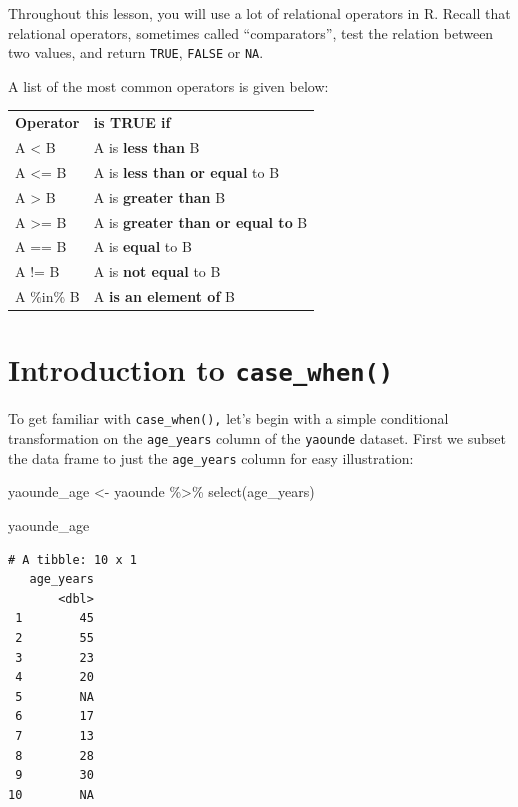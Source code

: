 \documentclass[
  letterpaper,
  DIV=11,
  numbers=noendperiod]{scrreprt}
\newenvironment{Shaded}{\begin{snugshade}}{\end{snugshade}}
\newcommand{\FunctionTok}[1]{\textcolor[rgb]{0.28,0.35,0.67}{#1}}
\newcommand{\NormalTok}[1]{\textcolor[rgb]{0.00,0.23,0.31}{#1}}
\newcommand{\OtherTok}[1]{\textcolor[rgb]{0.00,0.23,0.31}{#1}}
\newcommand{\SpecialCharTok}[1]{\textcolor[rgb]{0.37,0.37,0.37}{#1}}
\begin{document}
Throughout this lesson, you will use a lot of relational operators in R.
Recall that relational operators, sometimes called ``comparators'', test
the relation between two values, and return \texttt{TRUE},
\texttt{FALSE} or \texttt{NA}.

A list of the most common operators is given below:

\begin{longtable}[]{@{}ll@{}}
\toprule\noalign{}
\endhead
\bottomrule\noalign{}
\endlastfoot
\textbf{Operator} & \textbf{is TRUE if} \\
A \textless{} B & A is \textbf{less than} B \\
A \textless= B & A is \textbf{less than or equal} to B \\
A \textgreater{} B & A is \textbf{greater than} B \\
A \textgreater= B & A is \textbf{greater than or equal to} B \\
A == B & A is \textbf{equal} to B \\
A != B & A is \textbf{not equal} to B \\
A \%in\% B & A \textbf{is an element of} B \\
\end{longtable}

\hypertarget{introduction-to-case_when}{%
\section{\texorpdfstring{Introduction to
\texttt{case\_when()}}{Introduction to case\_when()}}\label{introduction-to-case_when}}

To get familiar with \texttt{case\_when(),} let's begin with a simple
conditional transformation on the \texttt{age\_years} column of the
\texttt{yaounde} dataset. First we subset the data frame to just the
\texttt{age\_years} column for easy illustration:

\begin{Shaded}
\begin{Highlighting}[]
\NormalTok{yaounde\_age }\OtherTok{\textless{}{-}} 
\NormalTok{  yaounde }\SpecialCharTok{\%\textgreater{}\%} 
  \FunctionTok{select}\NormalTok{(age\_years)}

\NormalTok{yaounde\_age}
\end{Highlighting}
\end{Shaded}

\begin{verbatim}
# A tibble: 10 x 1
   age_years
       <dbl>
 1        45
 2        55
 3        23
 4        20
 5        NA
 6        17
 7        13
 8        28
 9        30
10        NA
\end{verbatim}
\end{document}
